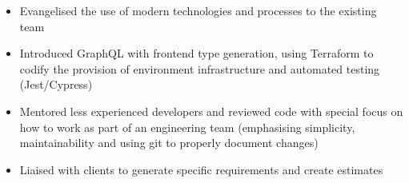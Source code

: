 \bigbreak
\begin{itemize}
    \item Evangelised the use of modern technologies and processes to the existing team
    \item Introduced GraphQL with frontend type generation, using Terraform to codify the provision of environment infrastructure and automated testing (Jest/Cypress)
    \item Mentored less experienced developers and reviewed code with special focus on how to work as part of an engineering team (emphasising simplicity, maintainability and using git to properly document changes)
    \item Liaised with clients to generate specific requirements and create estimates
\end{itemize}
